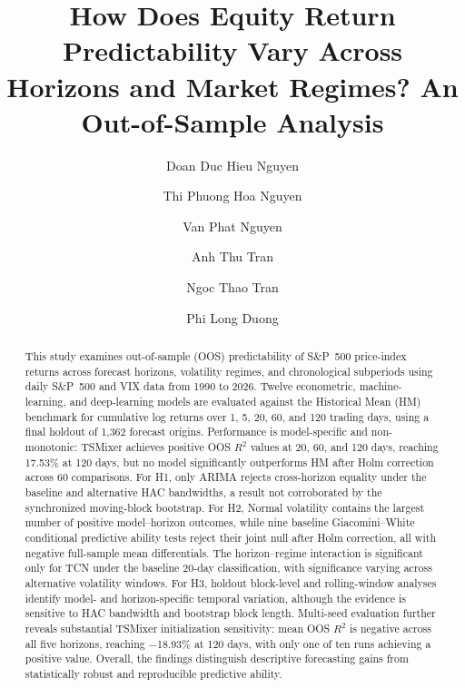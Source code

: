 \documentclass[runningheads,orivec]{llncs}
\begin{document}
%
\title{How Does Equity Return Predictability Vary Across Horizons and Market Regimes? An Out-of-Sample Analysis}
%
\author{Doan Duc Hieu Nguyen \and
Thi Phuong Hoa Nguyen \and
Van Phat Nguyen \and
Anh Thu Tran \and
Ngoc Thao Tran \and
Phi Long Duong}
%
%
\maketitle              %
%
\begin{abstract}
This study examines out-of-sample (OOS) predictability of S\&P~500 price-index returns across forecast horizons, volatility regimes, and chronological subperiods using daily S\&P~500 and VIX data from 1990 to 2026. Twelve econometric, machine-learning, and deep-learning models are evaluated against the Historical Mean (HM) benchmark for cumulative log returns over 1, 5, 20, 60, and 120 trading days, using a final holdout of 1,362 forecast origins. Performance is model-specific and non-monotonic: TSMixer achieves positive OOS $R^2$ values at 20, 60, and 120 days, reaching 17.53\% at 120 days, but no model significantly outperforms HM after Holm correction across 60 comparisons. For H1, only ARIMA rejects cross-horizon equality under the baseline and alternative HAC bandwidths, a result not corroborated by the synchronized moving-block bootstrap. For H2, Normal volatility contains the largest number of positive model--horizon outcomes, while nine baseline Giacomini--White conditional predictive ability tests reject their joint null after Holm correction, all with negative full-sample mean differentials. The horizon--regime interaction is significant only for TCN under the baseline 20-day classification, with significance varying across alternative volatility windows. For H3, holdout block-level and rolling-window analyses identify model- and horizon-specific temporal variation, although the evidence is sensitive to HAC bandwidth and bootstrap block length. Multi-seed evaluation further reveals substantial TSMixer initialization sensitivity: mean OOS $R^2$ is negative across all five horizons, reaching $-$18.93\% at 120 days, with only one of ten runs achieving a positive value. Overall, the findings distinguish descriptive forecasting gains from statistically robust and reproducible predictive ability.

\end{abstract}
\end{document}
